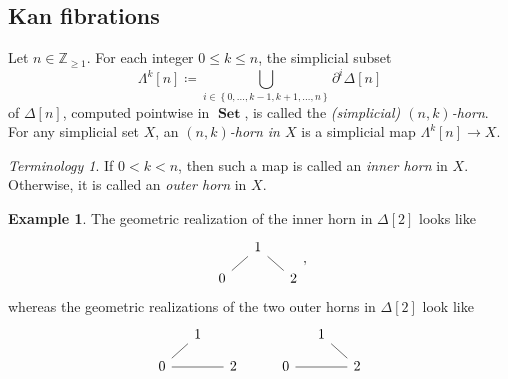 \documentclass[10pt,letterpaper,cm]{nupset}
\theoremstyle{definition}
\newtheorem{exmp}[definition]{Example}
\theoremstyle{theorem}
\theoremstyle{remark}
\newtheorem*{term}{Terminology}
\newcommand{\Z}{\mathbb Z}
\newcommand{\0}{\mathbf{0}}
\newcommand{\1}{\mathbf{1}}
\newcommand{\2}{\mathbf{2}}
\DeclareMathOperator{\sset}{\mathbf{sSet}}
\DeclareMathOperator{\set}{\mathbf{Set}}
\newcommand{\bi}{\begin{itemize}}
\newcommand{\ei}{\end{itemize}}
\begin{document}
\subsection*{Kan fibrations}

Let $n\in \Z_{\geq 1}$. For each integer $0\leq k\leq n$, the simplicial subset
\[
\Lambda^k[n]\coloneqq \bigcup_{i\in \left\{0,\ldots, k-1, k+1, \ldots, n\right\}}\partial^i{\Delta[n]}
\] of $\Delta[n]$, computed pointwise in $\set$,  is called the \textit{(simplicial) $\left(n,k\right)$-horn}. For any simplicial set $X$, an \textit{$\left(n,k\right)$-horn in $X$} is a simplicial map $\Lambda^k[n] \to X$. 
\begin{term}
If $0<k<n$, then such a map is called an \textit{inner horn} in $X$. Otherwise, it is called an \textit{outer horn} in $X$.
\end{term}

\begin{exmp}
The geometric realization of the inner horn in $\Delta[2]$ looks like
\[
\begin{tikzcd}[column sep=small, row sep=small]
             & 1 \arrow[rd, no head] &   \\
0 \arrow[ru, no head] &              & 2
\end{tikzcd},
\]
 whereas  the geometric realizations of the two outer horns in $\Delta[2]$ look like
 \[
\begin{tikzcd}[column sep=small, row sep=small]
                        & 1 &   &  &              & 1 \arrow[rd, no head] &   \\
0 \arrow[ru, no head] \arrow[rr, no head] &   & 2 &  & 0 \arrow[rr, no head] &              & 2
\end{tikzcd}
 \]
\end{exmp}

\smallskip

\begin{comment}
\medskip

Now is a good time to list a couple more discrete-geometric objects in $\sset$. Let $m\in \Z_{\geq 1}$.

\bi
\item A \textit{prism of dimension $m+n$} is the cartesian product $\Delta[m,n]\coloneqq \Delta[m]\times \Delta[n]$.

The \textit{boundary} of this simplicial set is given by the Leibniz rule:
\[
\partial{\Delta[m+n]} \coloneqq \left(\partial{\Delta[m]} \times \Delta[n]\right)\cup \left(\Delta[m]\times \partial{\Delta[n]}\right)
.\] 
\item By removing the face $\Delta[m]\times \partial^k{\Delta[n]}$ from $\partial{\Delta[m+n]}$, we obtain an \textit{open box}
\[
\Lambda^{m+1+k}[m,n]\coloneqq \left(\partial{\Delta[m]}\times \Delta[n]\right) \cup \left(\Delta[m] \times \Lambda^k[n]\right).
\]
\ei

\medskip
\end{comment}
\end{document}
